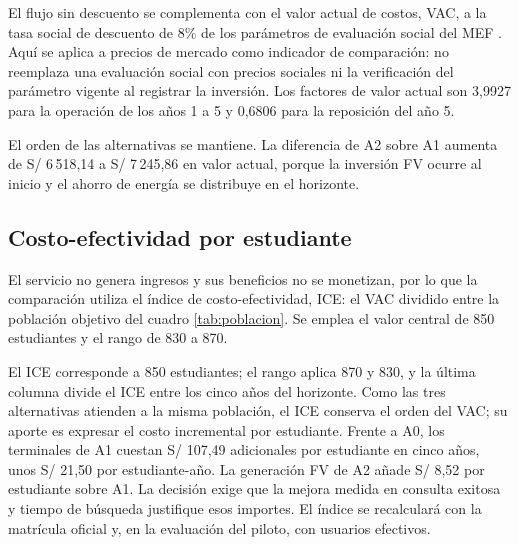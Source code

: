 El flujo sin descuento se complementa con el valor actual de costos, VAC, a la tasa social de descuento de 8\% de los parámetros de evaluación social del MEF \cite{mefparametros}. Aquí se aplica a precios de mercado como indicador de comparación: no reemplaza una evaluación social con precios sociales ni la verificación del parámetro vigente al registrar la inversión. Los factores de valor actual son 3,9927 para la operación de los años 1 a 5 y 0,6806 para la reposición del año 5.

El orden de las alternativas se mantiene. La diferencia de A2 sobre A1 aumenta de S/ 6\,518,14 a S/ 7\,245,86 en valor actual, porque la inversión FV ocurre al inicio y el ahorro de energía se distribuye en el horizonte.

\subsection{Costo-efectividad por estudiante}
El servicio no genera ingresos y sus beneficios no se monetizan, por lo que la comparación utiliza el índice de costo-efectividad, ICE: el VAC dividido entre la población objetivo del cuadro \ref{tab:poblacion}. Se emplea el valor central de 850 estudiantes y el rango de 830 a 870.

El ICE corresponde a 850 estudiantes; el rango aplica 870 y 830, y la última columna divide el ICE entre los cinco años del horizonte. Como las tres alternativas atienden a la misma población, el ICE conserva el orden del VAC; su aporte es expresar el costo incremental por estudiante. Frente a A0, los terminales de A1 cuestan S/ 107,49 adicionales por estudiante en cinco años, unos S/ 21,50 por estudiante-año. La generación FV de A2 añade S/ 8,52 por estudiante sobre A1. La decisión exige que la mejora medida en consulta exitosa y tiempo de búsqueda justifique esos importes. El índice se recalculará con la matrícula oficial y, en la evaluación del piloto, con usuarios efectivos.


